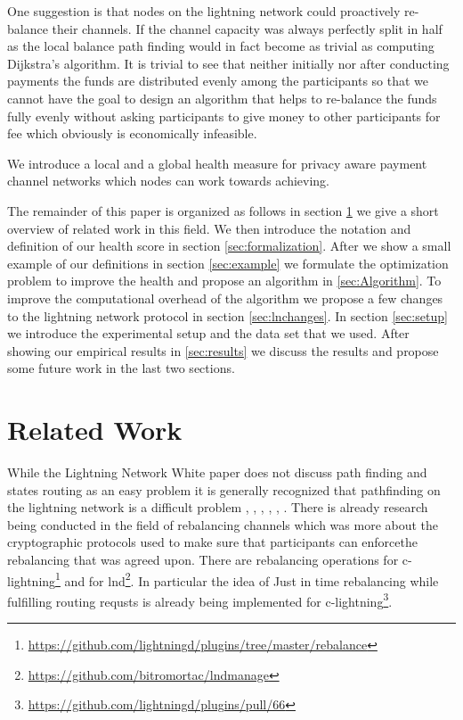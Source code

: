 \documentclass[a4paper]{paper}
\begin{document}
One suggestion is that nodes on the lightning network could proactively re-balance their channels.
If the channel capacity was always perfectly split in half as the local balance path finding would in fact become as trivial as computing Dijkstra's algorithm.
It is trivial to see that neither initially nor after conducting payments the funds are distributed evenly among the participants so that we cannot have the goal to design an algorithm that helps to re-balance the funds fully evenly without asking participants to give money to other participants for fee which obviously is economically infeasible. 

We introduce a local and a global health measure for privacy aware payment channel networks which nodes can work towards achieving.

The remainder of this paper is organized as follows in section \ref{sec:relatedWork} we give a short overview of related work in this field.
We then introduce the notation and definition of our health score in section \ref{sec:formalization}.
After we show a small example of our definitions in section \ref{sec:example} we formulate the optimization problem to improve the health and propose an algorithm in \ref{sec:Algorithm}.
To improve the computational overhead of the algorithm we propose a few changes to the lightning network protocol in section \ref{sec:lnchanges}.
In section \ref{sec:setup} we introduce the experimental setup and the data set that we used.
After showing our empirical results in \ref{sec:results} we discuss the results and propose some future work in the last two sections.

\section{Related Work}\label{sec:relatedWork}
While the Lightning Network White paper \cite{poon2016bitcoin} does not discuss path finding and states routing as an easy problem it is generally recognized that pathfinding on the lightning network is a difficult problem \cite{piatkivskyi2018split}, \cite{prihodko2016flare}, \cite{bagaria2019boomerang}, \cite{pickhardt2019pathfinding}, \cite{grunspan2018ant}, \cite{sivaraman2018routing}.
There is already research being conducted in the field of rebalancing channels \cite{khalil2017revive} which was more about the cryptographic protocols used to make sure that participants can enforcethe rebalancing that was agreed upon.
There are rebalancing operations for c-lightning\footnote{\url{https://github.com/lightningd/plugins/tree/master/rebalance}} and for lnd\footnote{\url{https://github.com/bitromortac/lndmanage}}.
In particular the idea of Just in time rebalancing while fulfilling routing requsts \cite{pickhardt2019jit} is already being implemented for c-lightning\footnote{\url{https://github.com/lightningd/plugins/pull/66}}. 
\end{document}
